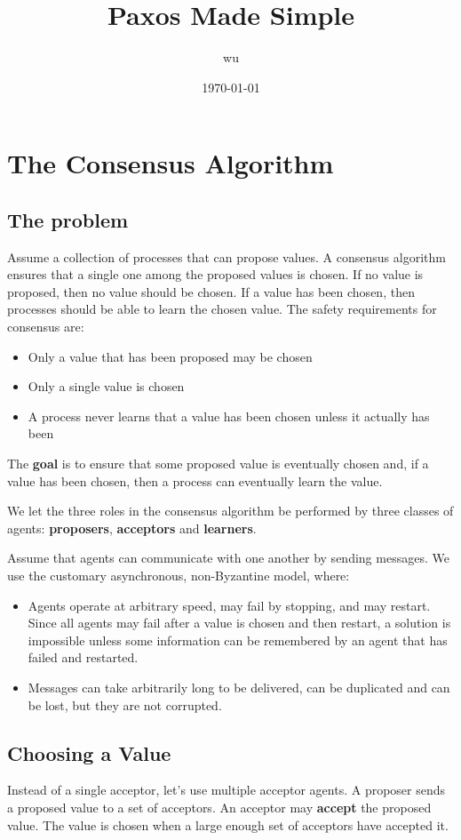 \documentclass[11pt]{article}
\author{wu}
\date{\today}
\title{Paxos Made Simple}
\begin{document}
\maketitle
\section{The Consensus Algorithm}
\label{sec:org2f58b0b}
\subsection{The problem}
\label{sec:orgf86f188}
Assume a collection of processes that can propose values. A consensus algorithm ensures that a single
one among the proposed values is chosen. If no value is proposed, then no value should be chosen. If a value
has been chosen, then processes should be able to learn the chosen value. The safety requirements for
consensus are:
\begin{itemize}
\item Only a value that has been proposed may be chosen
\item Only a single value is chosen
\item A process never learns that a value has been chosen unless it actually has been
\end{itemize}

The \textbf{goal} is to ensure that some proposed value is eventually chosen and, if a value has been chosen,
then a process can eventually learn the value.

We let the three roles in the consensus algorithm be performed by three classes of agents: \textbf{proposers},
\textbf{acceptors} and \textbf{learners}.

Assume that agents can communicate with one another by sending messages. We use the customary
asynchronous, non-Byzantine model, where:
\begin{itemize}
\item Agents operate at arbitrary  speed, may fail by stopping, and may restart. Since all agents may fail
after a value is chosen and then restart, a solution is impossible unless some information can be
remembered by an agent that has failed and restarted.
\item Messages can take arbitrarily long to be delivered, can be duplicated and can be lost, but they are
not corrupted.
\end{itemize}
\subsection{Choosing a Value}
\label{sec:orgb5861fa}
Instead of a single acceptor, let's use multiple acceptor agents. A proposer sends a proposed value to
a set of acceptors. An acceptor may \textbf{accept} the proposed value. The value is chosen when a large enough
set of acceptors have accepted it.
\end{document}
